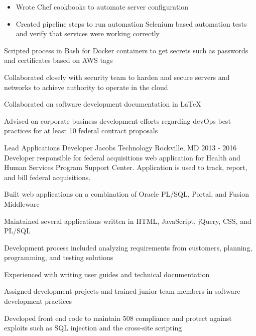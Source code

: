 \begin{cventries}
{\begin{cvitems}
\begin{itemize}
          \item {Wrote Chef cookbooks to automate server configuration}
          \item {Created pipeline steps to run automation Selenium based automation tests and verify that services were working correctly}
        \end{itemize}
        \item {Scripted process in Bash for Docker containers to get secrets such as passwords and certificates based on AWS tags}
        \item {Collaborated closely with security team to harden and secure servers and networks to achieve authority to operate in the cloud}
        \item {Collaborated on software development documentation in LaTeX}
        \item {Advised on corporate business development efforts regarding devOps best practices for at least 10 federal contract proposals}
      \end{cvitems}
    }


  \cventry
    {Lead Applications Developer} %
    {Jacobs Technology} %
    {Rockville, MD} %
    {2013 - 2016} %
    {Developer responsible for federal acquisitions web application for Health and Human Services Program Support Center. Application is used to track, report, and bill federal acquisitions.} %
    {
      \begin{cvitems} %
        \item {Built web applications on a combination of Oracle PL/SQL, Portal, and Fusion Middleware}
        \item {Maintained several applications written in HTML, JavaScript, jQuery, CSS, and PL/SQL}
        \item {Development process included analyzing requirements from customers, planning, programming, and testing solutions}
        \item {Experienced with writing user guides and technical documentation}
        \item {Assigned development projects and trained junior team members in software development practices}
        \item {Developed front end code to maintain 508 compliance and protect against exploits such as SQL injection and the cross-site scripting}
      \end{cvitems}
    }


\end{cventries}
